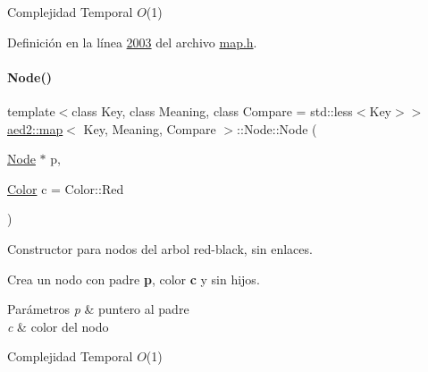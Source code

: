 \begin{DoxyDescription}
\item[Complejidad Temporal]$O$(1)
\end{DoxyDescription}

Definición en la línea \hyperlink{map_8h_source_l02003}{2003} del archivo \hyperlink{map_8h_source}{map.\+h}.

\mbox{\label{structaed2_1_1map_1_1Node_a62b5a42e88e219d53af8237a9ebedb6e_a62b5a42e88e219d53af8237a9ebedb6e}} 
\paragraph{\texorpdfstring{Node()}{Node()}\hspace{0.1cm}{\footnotesize\ttfamily [2/2]}}
{\footnotesize\ttfamily template$<$class Key, class Meaning, class Compare = std\+::less$<$\+Key$>$$>$ \\
\hyperlink{classaed2_1_1map}{aed2\+::map}$<$ Key, Meaning, Compare $>$\+::Node\+::\+Node (\begin{DoxyParamCaption}\item[{\hyperlink{structaed2_1_1map_1_1Node}{Node} $\ast$}]{p,  }\item[{\hyperlink{classaed2_1_1map_a6d62a415a4b9d320b30cada4ebcf9f5b_a6d62a415a4b9d320b30cada4ebcf9f5b}{Color}}]{c = {\ttfamily Color\+:\+:Red} }\end{DoxyParamCaption})\hspace{0.3cm}{\ttfamily [inline]}}



Constructor para nodos del arbol red-\/black, sin enlaces. 

Crea un nodo con padre {\bfseries p}, color {\bfseries c} y sin hijos.


\begin{DoxyParams}{Parámetros}
{\em p} & puntero al padre \\
\hline
{\em c} & color del nodo\\
\hline
\end{DoxyParams}

\begin{DoxyDescription}
\item[Complejidad Temporal]$O$(1)
\end{DoxyDescription}

